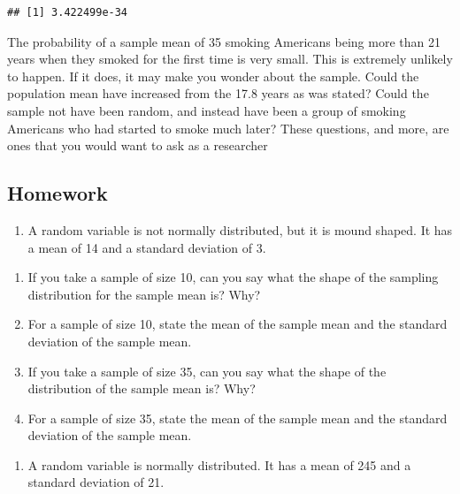 \documentclass[]{book}
\providecommand{\tightlist}{%
  \setlength{\itemsep}{0pt}\setlength{\parskip}{0pt}}
\begin{document}
\begin{verbatim}
## [1] 3.422499e-34
\end{verbatim}

The probability of a sample mean of 35 smoking Americans being more than 21 years when they smoked for the first time is very small. This is extremely unlikely to happen. If it does, it may make you wonder about the sample. Could the population mean have increased from the 17.8 years as was stated? Could the sample not have been random, and instead have been a group of smoking Americans who had started to smoke much later? These questions, and more, are ones that you would want to ask as a researcher

\hypertarget{homework-19}{%
\subsection{Homework}\label{homework-19}}

\begin{enumerate}
\def\labelenumi{\arabic{enumi}.}
\tightlist
\item
  A random variable is not normally distributed, but it is mound shaped. It has a mean of 14 and a standard deviation of 3.
\end{enumerate}

\begin{enumerate}
\def\labelenumi{\alph{enumi}.}
\tightlist
\item
  If you take a sample of size 10, can you say what the shape of the sampling distribution for the sample mean is? Why?
\item
  For a sample of size 10, state the mean of the sample mean and the standard deviation of the sample mean.
\item
  If you take a sample of size 35, can you say what the shape of the distribution of the sample mean is? Why?
\item
  For a sample of size 35, state the mean of the sample mean and the standard deviation of the sample mean.
\end{enumerate}

\begin{enumerate}
\def\labelenumi{\arabic{enumi}.}
\setcounter{enumi}{1}
\tightlist
\item
  A random variable is normally distributed. It has a mean of 245 and a standard deviation of 21.
\end{enumerate}
\end{document}
